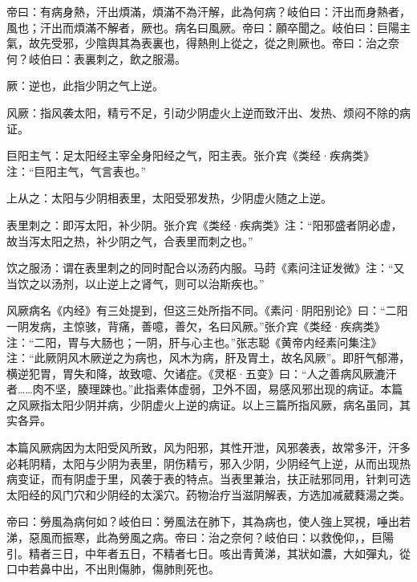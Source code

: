\documentclass[draft,12pt]{ctexbook}
\begin{document}

\begin{yuanwen}
帝曰：有病身熱，汗出煩滿，煩滿不為汗解，此為何病？岐伯曰：汗出而身熱者，風也；汗出而煩滿不解者，厥也。病名曰風厥。帝曰：願卒聞之。岐伯曰：巨陽主氣，故先受邪，少陰舆其為表裏也，得熱則上從之，從之則厥也。帝曰：治之奈何？岐伯曰：表裏刺之，飲之服湯。
\end{yuanwen}


\begin{jiaozhu}
	\item 厥：逆也，此指少阴之气上逆。
	\item 风厥：指风袭太阳，精亏不足，引动少阴虚火上逆而致汗出、发热、烦闷不除的病证。
	\item 巨阳主气：足太阳经主宰全身阳经之气，阳主表。张介宾《类经·疾病类》注：“巨阳主气，气言表也。”
	\item 上从之：太阳与少阴相表里，太阳受邪发热，少阴虚火随之上逆。
	\item 表里刺之：即泻太阳，补少阴。张介宾《类经·疾病类》注：“阳邪盛者阴必虚，故当泻太阳之热，补少阴之气，合表里而刺之也。”
	\item 饮之服汤：谓在表里刺之的同时配合以汤药内服。马莳《素问注证发微》注：“又当饮之以汤剂，以止逆上之肾气，则可以治斯疾也。”
\end{jiaozhu}



风厥病名《内经》有三处提到，但这三处所指不同。《素问·阴阳别论》曰：“二阳一阴发病，主惊骇，背痛，善噫，善欠，名曰风厥。”张介宾《类经·疾病类》注：“二阳，胃与大肠也；一阴，肝与心主也。”张志聪《黄帝内经素问集注》注：“此厥阴风木厥逆之为病也，风木为病，肝及胃土，故名风厥”。即肝气郁滞，横逆犯胃，胃失和降，故致噫、欠诸症。《灵枢·五变》曰：“人之善病风厥漉汗者……肉不坚，腠理踈也。”此指素体虚弱，卫外不固，易感风邪出现的病证。本篇之风厥指太阳少阴并病，少阴虚火上逆的病证。以上三篇所指风厥，病名虽同，其实各异。


本篇风厥病因为太阳受风所致，风为阳邪，其性开泄，风邪袭表，故常多汗，汗多必耗阴精，太阳与少阴为表里，阴伤精亏，邪入少阴，少阴经气上逆，从而出现热病变证，而有阴虚于里，风袭于表的特点。当表里兼治，扶正祛邪同用，针刺可选太阳经的风门穴和少阴经的太溪穴。药物治疗当滋阴解表，方选加减葳蕤湯之类。


\begin{yuanwen}
帝曰：勞風為病何如？岐伯曰：勞風法在肺下，其為病也，使人強上冥視，唾出若涕，惡風而振寒，此為勞風之病。帝曰：治之奈何？岐伯曰：以救俛仰，，巨陽引。精者三日，中年者五日，不精者七日。咳出青黄涕，其狀如濃，大如彈丸，從口中若鼻中出，不出則傷肺，傷肺則死也。
\end{yuanwen}
\end{document}
